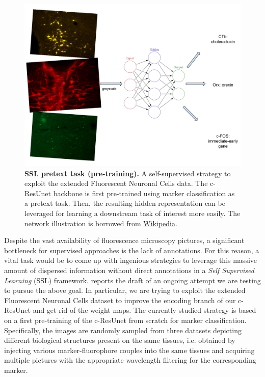 \begin{figure}
    \centering
    \includegraphics[width=\textwidth]{figures/610_future_works/self-supervised pretext task.pdf}
    \caption{\textbf{SSL pretext task (pre-training).} A self-supervised strategy to exploit the extended Fluorescent Neuronal Cells data. The c-ResUnet backbone is first pre-trained using marker classification as a pretext task. 
    Then, the resulting hidden representation can be leveraged for learning a downstream task of interest more easily.
    The network illustration is borrowed from  \href{https://en.wikipedia.org/wiki/Artificial_neural_network\#/media/File:Colored_neural_network.svg}{Wikipedia}.
    }
    \label{fig:SSL_diagram}
\end{figure}
Despite the vast availability of fluorescence microscopy pictures, a significant bottleneck for supervised approaches is the lack of annotations. 
For this reason, a vital task would be to come up with ingenious strategies to leverage this massive amount of dispersed information without direct annotations in a \textit{Self Supervised Learning} (SSL) framework.
 reports the draft of an ongoing attempt we are testing to pursue the above goal. 
In particular, we are trying to exploit the extended Fluorescent Neuronal Cells dataset to improve the encoding branch of our c-ResUnet and get rid of the weight maps. The currently studied strategy is based on a first pre-training of the c-ResUnet from scratch for marker classification. 
Specifically, the images are randomly sampled from three datasets depicting different biological structures present on the same tissues, i.e. obtained by injecting various marker-fluorophore couples into the same tissues and acquiring multiple pictures with the appropriate wavelength filtering for the corresponding marker.
